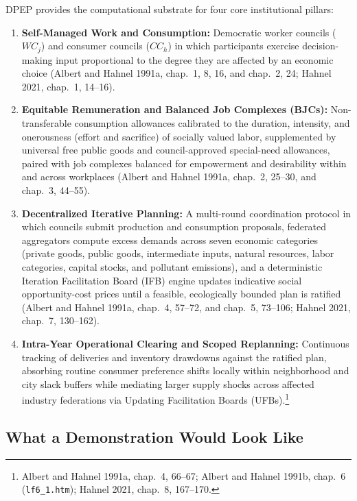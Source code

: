 \documentclass[10pt,twoside,openany]{book}
\theoremstyle{dpepstyle}
\begin{document}
DPEP provides the computational substrate for four core institutional pillars:
\begin{enumerate}[leftmargin=1.8em,itemsep=2pt]
  \item \textbf{Self-Managed Work and Consumption:} Democratic worker councils ($WC_j$) and consumer councils ($CC_h$) in which participants exercise decision-making input proportional to the degree they are affected by an economic choice (Albert and Hahnel 1991a, chap.~1, 8, 16, and chap.~2, 24; Hahnel 2021, chap.~1, 14--16).
  \item \textbf{Equitable Remuneration and Balanced Job Complexes (BJCs):} Non-transferable consumption allowances calibrated to the duration, intensity, and onerousness (effort and sacrifice) of socially valued labor, supplemented by universal free public goods and council-approved special-need allowances, paired with job complexes balanced for empowerment and desirability within and across workplaces (Albert and Hahnel 1991a, chap.~2, 25--30, and chap.~3, 44--55).
  \item \textbf{Decentralized Iterative Planning:} A multi-round coordination protocol in which councils submit production and consumption proposals, federated aggregators compute excess demands across seven economic categories (private goods, public goods, intermediate inputs, natural resources, labor categories, capital stocks, and pollutant emissions), and a deterministic Iteration Facilitation Board (IFB) engine updates indicative social opportunity-cost prices until a feasible, ecologically bounded plan is ratified (Albert and Hahnel 1991a, chap.~4, 57--72, and chap.~5, 73--106; Hahnel 2021, chap.~7, 130--162).
  \item \textbf{Intra-Year Operational Clearing and Scoped Replanning:} Continuous tracking of deliveries and inventory drawdowns against the ratified plan, absorbing routine consumer preference shifts locally within neighborhood and city slack buffers while mediating larger supply shocks across affected industry federations via Updating Facilitation Boards (UFBs).\footnote{Albert and Hahnel 1991a, chap.~4, 66--67; Albert and Hahnel 1991b, chap.~6 (\texttt{lf6\_1.htm}); Hahnel 2021, chap.~8, 167--170.}
\end{enumerate}

\subsection{What a Demonstration Would Look Like}
\label{sec:demo-brief}
\end{document}
